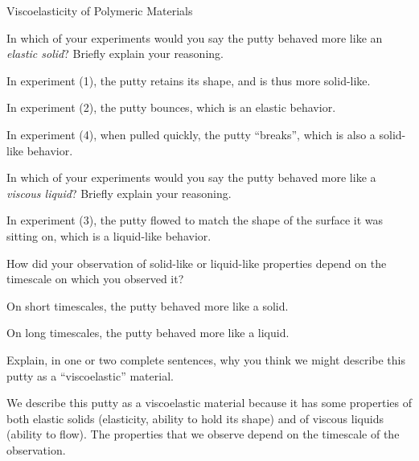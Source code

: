 \begin{activity}{Viscoelasticity of Polymeric Materials}
\begin{model}
\end{model}


\begin{ctqs}

	\question In which of your experiments would you say the putty behaved more like an \emph{elastic solid}?  Briefly explain your reasoning.
	
		\begin{solution}[1.25in]
		
			In experiment (1), the putty retains its shape, and is thus more solid-like.  
			
			In experiment (2), the putty bounces, which is an elastic behavior.
			
			In experiment (4), when pulled quickly, the putty ``breaks'', which is also a solid-like behavior.
		
		\end{solution}
	
	\question In which of your experiments would you say the putty behaved more like a \emph{viscous liquid}?  Briefly explain your reasoning.
	
		\begin{solution}[1in]
		
			In experiment (3), the putty flowed to match the shape of the surface it was sitting on, which is a liquid-like behavior.
		
		\end{solution}
	
	\question How did your observation of solid-like or liquid-like properties depend on the timescale on which you observed it?
	
		\begin{solution}[1in]
		
			On short timescales, the putty behaved more like a solid.
			
			On long timescales, the putty behaved more like a liquid.
			
		\end{solution}
		
	\question Explain, in one or two complete sentences, why you think we might describe this putty as a ``viscoelastic'' material.
	
			\begin{solution}[2in]
			
				We describe this putty as a viscoelastic material because it  has some properties of both elastic solids (elasticity, ability to hold its shape) and of viscous liquids (ability to flow).  The properties that we observe depend on the timescale of the observation.
				

\end{solution}
\end{ctqs}
\end{activity}

